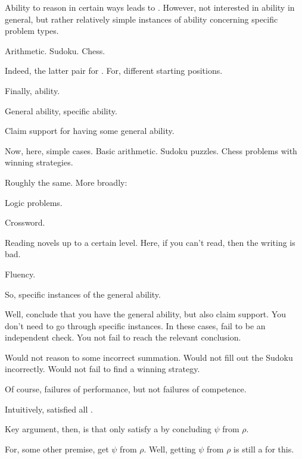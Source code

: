 \begin{note}[Ability]
  Ability to reason in certain ways leads to .
  However, not interested in ability in general, but rather relatively simple instances of ability concerning specific problem types.

  Arithmetic.
  Sudoku.
  Chess.

  Indeed, the latter pair for .
  For, different starting positions.
\end{note}

\begin{note}
  Finally, ability.

  General ability, specific ability.

  Claim support for having some general ability.

  Now, here, simple cases.
  Basic arithmetic.
  Sudoku puzzles.
  Chess problems with winning strategies.

  Roughly the same.
  More broadly:

  Logic problems.

  Crossword.

  Reading novels up to a certain level.
  Here, if you can't read, then the writing is bad.

  Fluency.

  So, specific instances of the general ability.
\end{note}

\begin{note}
  Well, conclude that you have the general ability, but also claim support.
  You don't need to go through specific instances.
  In these cases, fail to be an independent check.
  You not fail to reach the relevant conclusion.

  Would not reason to some incorrect summation.
  Would not fill out the Sudoku incorrectly.
  Would not fail to find a winning strategy.

  Of course, failures of performance, but not failures of competence.

  Intuitively, satisfied all .
\end{note}


\begin{note}
  Key argument, then, is that only satisfy a \requ{} by concluding \(\psi\) from \(\rho\).

  For, some other premise, get \(\psi\) from \(\rho\).
  Well, getting \(\psi\) from \(\rho\) is still a \requ{} for this.
\end{note}

